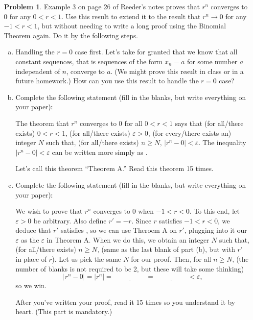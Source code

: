 \documentclass[11pt,oneside]{amsart}
\theoremstyle{definition}
\newtheorem{problem}{Problem}
\theoremstyle{plain}
\newcommand{\eps}{\varepsilon}
\newcommand{\blank}{\underline{\hspace{1cm}}}
\newcommand{\longblank}{\underline{\hspace{2cm}}}
\begin{document}
    \begin{problem}
        Example 3 on page 26 of Reeder's notes proves that $r^n$ converges to 0 for any $0<r<1$. Use this result to extend it to the result that $r^n\to 0$ for any $-1<r<1$, but without needing to write a long proof using the Binomial Theorem again. Do it by the following steps.
        \begin{enumerate}[(a)]
            \item Handling the $r=0$ case first. Let's take for granted that we know that all constant sequences, that is sequences of the form $x_n=a$ for some number $a$ independent of $n$, converge to $a$. (We might prove this result in class or in a future homework.) How can you use this result to handle the $r=0$ case?

            \item Complete the following statement (fill in the blanks, but write everything on your paper):
            
            The theorem that $r^n$ converges to 0 for all $0<r<1$ says that \blank (for all/there exists) $0<r<1$, \blank (for all/there exists) $\eps>0$, \blank (for every/there exists an) integer $N$ such that, \blank (for all/there exists) $n\geq N$, $|r^n-0|<\eps$. The inequality $|r^n-0|<\eps$ can be written more simply as \longblank.
            
            Let's call this theorem ``Theorem A.'' Read this theorem 15 times.

            \item Complete the following statement (fill in the blanks, but write everything on your paper):
            
            We wish to prove that $r^n$ converges to 0 when $-1<r<0$. To this end, let $\eps>0$ be arbitrary. Also define $r'=-r$. Since $r$ satisfies $-1<r<0$, we deduce that $r'$ satisfies \blank, so we can use Theroem A on $r'$, plugging into it our $\eps$ as the $\eps$ in Theorem A. When we do this, we obtain an integer $N$ such that, \blank (for all/there exists) $n\geq N$, \longblank (same as the last blank of part (b), but with $r'$ in place of $r$). Let us pick the same $N$ for our proof. Then, for all $n\geq N$, (the number of blanks is not required to be 2, but these will take some thinking)
            \[|r^n-0|=|r^n|=\longblank=\longblank<\eps,\]
            so we win.

            After you've written your proof, read it 15 times so you understand it by heart. (This part is mandatory.)
        \end{enumerate}
    \end{problem}
\end{document}
